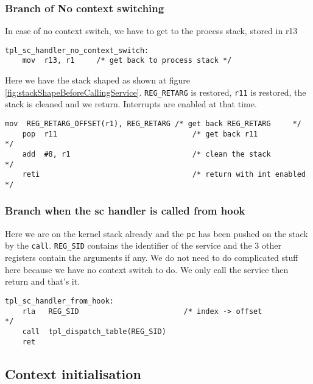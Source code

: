 \documentclass[11pt, oneside]{article}   	%
\begin{document}
\subsubsection{Branch of No context switching}

In case of no context switch, we have to get to the process stack, stored in r13

\begin{lstlisting}[backgroundcolor=\color{red!15}]
tpl_sc_handler_no_context_switch:
    mov  r13, r1	 /* get back to process stack */
\end{lstlisting}

Here we have the stack shaped as shown at figure \ref{fig:stackShapeBeforeCallingService}.
\lstinline{REG_RETARG} is restored, \lstinline{r11} is restored, the stack is cleaned and we return. Interrupts are enabled at that time.

\begin{lstlisting}[backgroundcolor=\color{yellow!15}]
    mov  REG_RETARG_OFFSET(r1), REG_RETARG /* get back REG_RETARG     */
    pop  r11                               /* get back r11            */
    add  #8, r1                            /* clean the stack         */
    reti                                   /* return with int enabled */
\end{lstlisting}

\subsubsection{Branch when the sc handler is called from hook}

Here we are on the kernel stack already and the \lstinline{pc} has been pushed on the stack by the \lstinline{call}. \lstinline{REG_SID} contains the identifier of the service and the 3 other registers contain the arguments if any. We do not need to do complicated stuff here because we have no context switch to do. We only call the service then return and that's it.

\begin{lstlisting}[backgroundcolor=\color{yellow!15}]
tpl_sc_handler_from_hook:
    rla   REG_SID                        /* index -> offset               */
    call  tpl_dispatch_table(REG_SID)
    ret
\end{lstlisting}

\subsection{Context initialisation}
\end{document}
